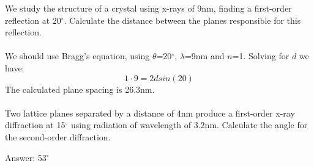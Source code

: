 \documentclass[main.tex]{subfiles}
\begin{document}
\begin{description}
\begin{example} %
We study the structure of a crystal using x-rays of 9nm, finding a first-order reflection at 20$^{\circ}$. Calculate the distance between the planes responsible for this reflection.
\\
\\
We should use Bragg's equation, using $\theta$=20$^{\circ}$, $\lambda$=9nm and $n$=1. Solving for $d$ we have:
\[1\cdot 9 = 2d sin(20)\]
The calculated plane spacing is 26.3nm.
\\
\faDiamond\ \\
Two lattice planes separated by a distance of 4nm produce a first-order x-ray diffraction at 15$^{\circ}$ using radiation of wavelength of 3.2nm. Calculate the angle for the second-order diffraction.
\begin{flushright} Answer: 53$^{\circ}$  \end{flushright}
\end{example}%


\end{description}

\newpage
\end{document}

